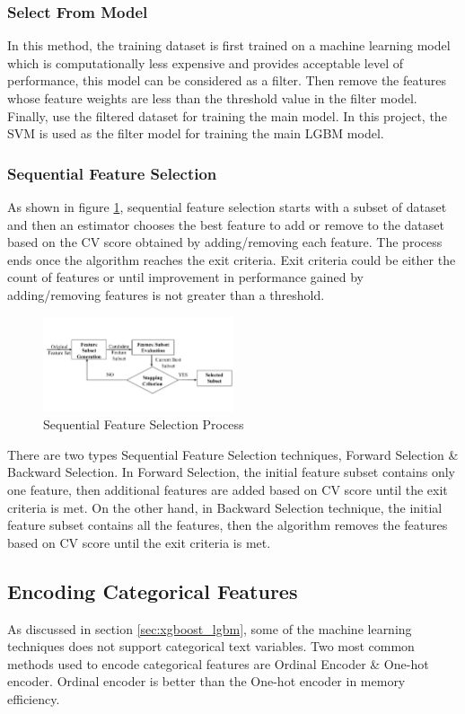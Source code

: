 \documentclass[twoside,11pt,a4paper]{article}
\begin{document}
\subsubsection{Select From Model}
In this method, the training dataset is first trained on a machine learning model which is computationally less expensive and provides acceptable level of performance, this model can be considered as a filter. Then remove the features whose feature weights are less than the threshold value in the filter model. Finally, use the filtered dataset for training the main model. In this project, the \acs{SVM} is used as the filter model for training the main \acs{LGBM} model.
\subsubsection{Sequential Feature Selection}
As shown in figure \ref{fig:seq_feature_selection}, sequential feature selection starts with a subset of dataset and then an estimator chooses the best feature to add or remove to the dataset based on the \acf{CV} score obtained by adding/removing each feature. The process ends once the algorithm reaches the exit criteria. Exit criteria could be either the count of features or until improvement in performance gained by adding/removing features is not greater than a threshold.\\
\begin{figure}[ht]
	\centering
	\includegraphics[width=0.5\textwidth]{seq_feature_selection}
	\caption[Sequential Feature Selection Flowchart]{Sequential Feature Selection Process\citep{beyan2015detection}}
	\label{fig:seq_feature_selection}
\end{figure}
\FloatBarrier
There are two types Sequential Feature Selection techniques, Forward Selection \& Backward Selection. In Forward Selection, the initial feature subset contains only one feature, then additional features are added based on \acs{CV} score until the exit criteria is met. On the other hand, in Backward Selection technique, the initial feature subset contains all the features, then the algorithm removes the features based on \acs{CV} score until the exit criteria is met. 
\subsection{Encoding Categorical Features}
As discussed in section \ref{sec:xgboost_lgbm}, some of the machine learning techniques does not support categorical text variables. Two most common methods used to encode categorical features are Ordinal Encoder \& One-hot encoder. Ordinal encoder is better than the One-hot encoder in memory efficiency.
\end{document}
